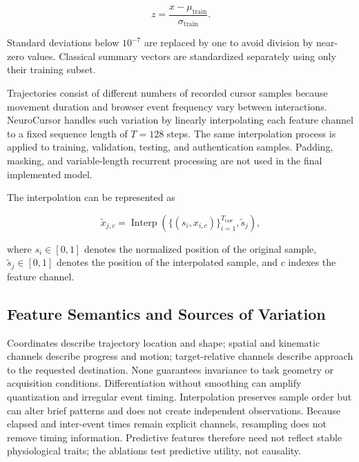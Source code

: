 \documentclass[conference]{IEEEtran}
\begin{document}
\begin{equation}
z
=
\frac{x-\mu_{\mathrm{train}}}{\sigma_{\mathrm{train}}}.
\label{eq:zscore_normalization}
\end{equation}

Standard deviations below $10^{-7}$ are replaced by one to avoid division by
near-zero values. Classical summary vectors are standardized separately using
only their training subset.

Trajectories consist of different numbers of recorded cursor samples because movement duration and browser event frequency vary between interactions. NeuroCursor handles such variation by linearly interpolating each feature channel to a fixed sequence length of $T=128$ steps. The same interpolation process is applied to training, validation, testing, and authentication samples. Padding, masking, and variable-length recurrent processing are not used in the final implemented model.

The interpolation can be represented as

\begin{equation}
\widetilde{x}_{j,c}
=
\operatorname{Interp}
\left(
\{(s_i,x_{i,c})\}_{i=1}^{T_{\mathrm{raw}}},
\widetilde{s}_j
\right),
\label{eq:sequence_interpolation}
\end{equation}

where $s_i\in[0,1]$ denotes the normalized position of the original sample,
$\widetilde{s}_j\in[0,1]$ denotes the position of the interpolated sample,
and $c$ indexes the feature channel.

\subsection{Feature Semantics and Sources of Variation}

Coordinates describe trajectory location and shape; spatial and kinematic
channels describe progress and motion; target-relative channels describe
approach to the requested destination. None guarantees invariance to task
geometry or acquisition conditions. Differentiation without smoothing can
amplify quantization and irregular event timing. Interpolation preserves
sample order but can alter brief patterns and does not create independent
observations. Because elapsed and inter-event times remain explicit channels,
resampling does not remove timing information. Predictive features therefore
need not reflect stable physiological traits; the ablations test predictive
utility, not causality.
\end{document}

